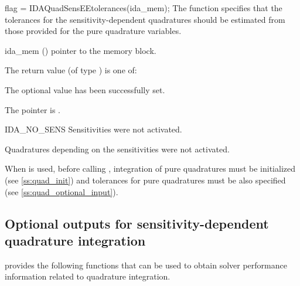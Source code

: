 {
  flag = IDAQuadSensEEtolerances(ida\_mem);
}
{
  The function  specifies that the tolerances for
  the sensitivity-dependent quadratures should be estimated from those provided
  for the pure quadrature variables. 
}
{
  \begin{args}
  \item[ida\_mem] ()
    pointer to the {\idas} memory block.
  \end{args}
}
{
  The return value  (of type ) is one of:
  \begin{args}
  \item[\Id{IDA\_SUCCESS}] 
    The optional value has been successfully set.
  \item[\Id{IDA\_MEM\_NULL}]
    The  pointer is .
  \item[IDA\_NO\_SENS]
    Sensitivities were not activated.
  \item[\Id{IDA\_NO\_QUADSENS}] 
    Quadratures depending on the sensitivities were not activated.
  \end{args}
}
{ 
  When   is used, before calling , 
  integration of pure quadratures must be initialized (see \ref{ss:quad_init})
  and tolerances for pure quadratures must be also specified 
  (see \ref{ss:quad_optional_input}).
  
}


\subsection{Optional outputs for sensitivity-dependent quadrature integration}
\label{ss:quad_sens_optional_output}

{\idas} provides the following functions that can be used to obtain solver
performance information related to quadrature integration.

